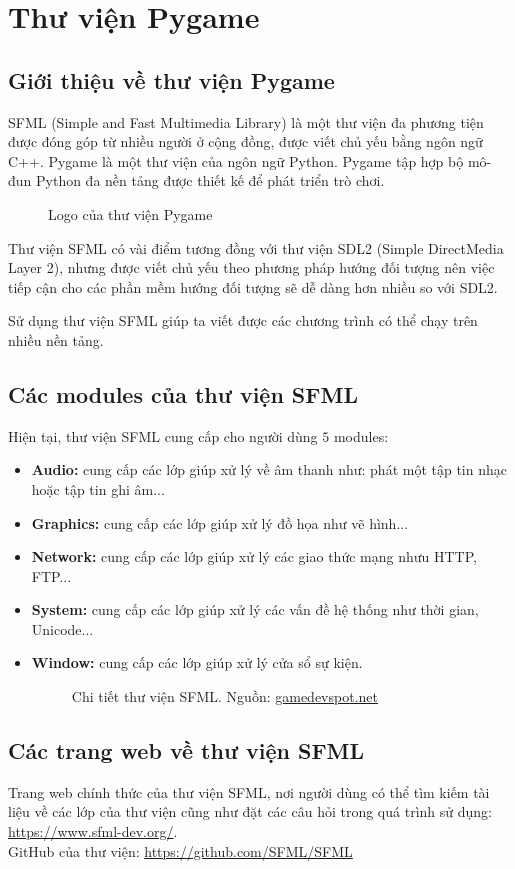 \section{Thư viện Pygame}
\subsection{Giới thiệu về thư viện Pygame}
SFML (Simple and Fast Multimedia Library) là một thư viện đa phương tiện được đóng góp từ nhiều người ở cộng đồng, được viết chủ yếu bằng ngôn ngữ C++.
Pygame là một thư viện của ngôn ngữ Python. Pygame tập hợp bộ mô- đun Python đa nền tảng được thiết kế để phát triển trò chơi.

\begin{figure}[H]
\caption{Logo của thư viện Pygame}
\end{figure}

Thư viện SFML có vài điểm tương đồng với thư viện SDL2 (Simple DirectMedia Layer 2), nhưng được viết chủ yếu theo phương pháp hướng đối tượng nên việc tiếp cận cho các phần mềm hướng đối tượng sẽ dễ dàng hơn nhiều so với SDL2.

Sử dụng thư viện SFML giúp ta viết được các chương trình có thể chạy trên nhiều nền tảng.

\subsection{Các modules của thư viện SFML}
Hiện tại, thư viện SFML cung cấp cho người dùng $5$ modules:
\begin{itemize}
\item \textbf{Audio:} cung cấp các lớp giúp xử lý về âm thanh như: phát một tập tin nhạc hoặc tập tin ghi âm...
\item \textbf{Graphics:} cung cấp các lớp giúp xử lý đồ họa như vẽ hình...
\item \textbf{Network:} cung cấp các lớp giúp xử lý các giao thức mạng nhưu HTTP, FTP...
\item \textbf{System:} cung cấp các lớp giúp xử lý các vấn đề hệ thống như thời gian, Unicode...
\item \textbf{Window:} cung cấp các lớp giúp xử lý cửa sổ sự kiện.
\begin{figure}[H]
\caption{Chi tiết thư viện SFML. Nguồn: \url{gamedevspot.net}}
\end{figure}
\end{itemize}


\subsection{Các trang web về thư viện SFML}
Trang web chính thức của thư viện SFML, nơi người dùng có thể tìm kiếm tài liệu về các lớp của thư viện cũng như đặt các câu hỏi trong quá trình sử dụng: \url{https://www.sfml-dev.org/}.\\
GitHub của thư viện: \url{https://github.com/SFML/SFML}